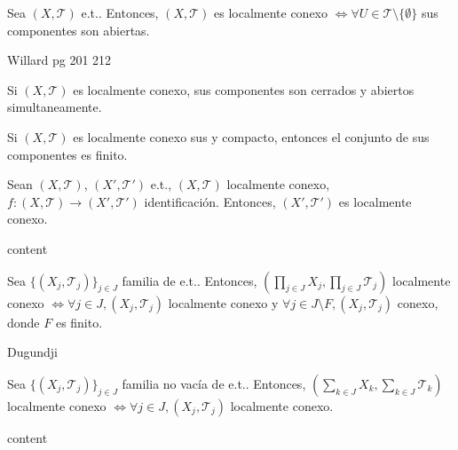 \begin{prop}
  Sea $( X, \mathcal{T} )$ e.t.. Entonces, $( X, \mathcal{T} )$ es localmente conexo $\Leftrightarrow \forall U \in \mathcal{T} \setminus \{ \emptyset \}$ sus componentes son abiertas.
\end{prop}

\begin{dem}
  Willard pg 201 212
\end{dem}

\begin{obs}
  Si $( X, \mathcal{T} )$ es localmente conexo, sus componentes son cerrados y abiertos simultaneamente.
\end{obs}

\begin{obs}
  Si $( X, \mathcal{T} )$ es localmente conexo sus y compacto, entonces el conjunto de sus componentes es finito.
\end{obs}

\begin{prop}
  Sean $( X, \mathcal{T} )$, $( X', \mathcal{T}' )$ e.t., $( X, \mathcal{T} )$ localmente conexo, $f : ( X, \mathcal{T} ) \to ( X', \mathcal{T}' )$ identificación. Entonces, $( X', \mathcal{T}' )$ es localmente conexo.
\end{prop}

\begin{dem}
  content
\end{dem}

\begin{prop}
  Sea  $\{ ( X_{j}, \mathcal{T}_{j} ) \}_{j \in J}$ familia de e.t.. Entonces, $( \prod_{j \in J} X_{j}, \prod_{j \in J} \mathcal{T}_{j} )$ localmente conexo $\Leftrightarrow \forall j \in J, ( X_{j}, \mathcal{T}_{j} )$ localmente conexo y $\forall j \in J \setminus F, ( X_{j}, \mathcal{T}_{j} )$ conexo, donde $F$ es finito.
\end{prop}

\begin{dem}
  Dugundji
\end{dem}

\begin{prop}
  Sea $\{ ( X_{j}, \mathcal{T}_{j} ) \}_{j \in J}$ familia no vacía de e.t.. Entonces, $( \sum_{k \in J} X_{k}, \sum_{k \in J} \mathcal{T}_{k})$ localmente conexo $\Leftrightarrow \forall j \in J, ( X_{j}, \mathcal{T}_{j} )$ localmente conexo.
\end{prop}

\begin{dem}
  content
\end{dem}

